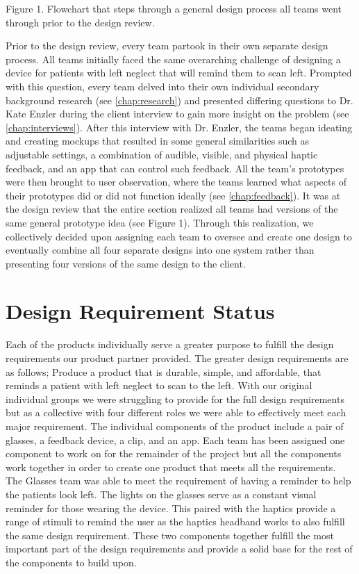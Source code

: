 Figure 1. Flowchart that steps through a general design process all teams went
through prior to the design review.

Prior to the design review, every team partook in their own separate design
process. All teams initially faced the same overarching challenge of designing a
device for patients with left neglect that will remind them to scan
left. Prompted with this question, every team delved into their own individual
secondary background research (see \autoref{chap:research}) and presented differing
questions to Dr. Kate Enzler during the client interview to gain more insight on
the problem (see \autoref{chap:interviews}). After this interview with
Dr. Enzler, the teams began ideating and creating mockups that resulted in some
general similarities such as adjustable settings, a combination of audible,
visible, and physical haptic feedback, and an app that can control such
feedback. All the team’s prototypes were then brought to user observation, where
the teams learned what aspects of their prototypes did or did not function
ideally (see \autoref{chap:feedback}). It was at the design review that the entire
section realized all teams had versions of the same general prototype idea
 (see Figure 1).
Through this realization, we collectively decided upon assigning each
team to oversee and create one design to eventually combine all four separate
designs into one system rather than presenting four versions of the same design
to the client. 

\section{Design Requirement Status}

Each of the products individually serve a greater purpose to fulfill the design
requirements our product partner provided. The greater design requirements are
as follows; Produce a product that is durable, simple, and affordable, that
reminds a patient with left neglect to scan to the left. With our original
individual groups we were struggling to provide for the full design requirements
but as a collective with four different roles we were able to effectively meet
each major requirement. The individual components of the product include a pair
of glasses, a feedback device, a clip, and an app. Each team has been assigned
one component to work on for the remainder of the project but all the components
work together in order to create one product that meets all the
requirements. The Glasses team was able to meet the requirement of having a
reminder to help the patients look left. The lights on the glasses serve as a
constant visual reminder for those wearing the device. This paired with the
haptics provide a range of stimuli to remind the user as the haptics headband
works to also fulfill the same design requirement. These two components together
fulfill the most important part of the design requirements and provide a solid
base for the rest of the components to build upon. 

